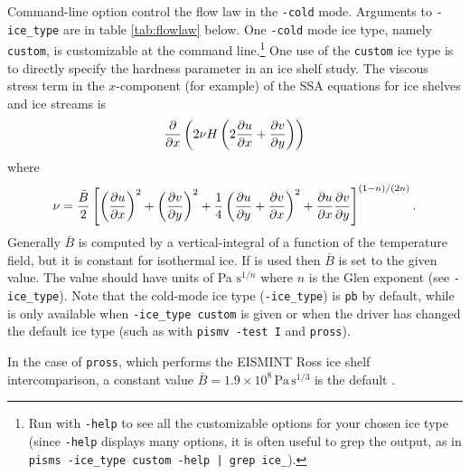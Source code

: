 Command-line option  control the flow law in the \texttt{-cold} mode.  Arguments to \texttt{-ice_type} are in table \ref{tab:flowlaw} below.  One \texttt{-cold} mode ice type, namely \texttt{custom}, is customizable at the command line.\footnote{Run with \texttt{-help} to see all the customizable options for your chosen ice type (since \texttt{-help} displays many options, it is often useful to grep the output, as in \texttt{pisms -ice_type custom -help | grep ice_}).}  One use of the \texttt{custom} ice type is to directly specify the hardness parameter in an ice shelf study.  The viscous stress term in the $x$-component (for example) of the SSA equations for ice shelves and ice streams is
	$$\frac{\partial }{\partial x}\left(2\nu H\left(2\frac{\partial u}{\partial x} + \frac{\partial v}{\partial y}\right)\right)$$
where 
	$$\nu = \frac{\bar B}{2} \left[\left(\frac{\partial u}{\partial x}\right)^2 + \left(\frac{\partial v}{\partial y}\right)^2 +
  \frac{1}{4} \left(\frac{\partial u}{\partial y} + \frac{\partial v}{\partial x}\right)^2 + \frac{\partial u}{\partial x}\frac{\partial v}{\partial y}\right]^{(1-n)/(2n)}.$$
Generally $\bar B$ is computed by a vertical-integral of a function of the temperature field, but it is constant for isothermal ice.  If  is used then $\bar B$ is set to the given value.  The value should have units of Pa $\text{s}^{1/n}$ where $n$ is the Glen exponent (see \texttt{-ice_type}).  Note that the cold-mode ice type (\texttt{-ice_type}) is \texttt{pb} by default, while  is only available when \texttt{-ice_type custom} is given or when the driver has changed the default ice type (such as with \texttt{pismv -test I} and \texttt{pross}).

In the case of \texttt{pross}, which performs the EISMINT Ross ice shelf intercomparison, a constant value $\bar B = 1.9 \times 10^8 \, \text{Pa}\, \text{s}^{1/3}$ is the default \cite{MacAyealetal}.

